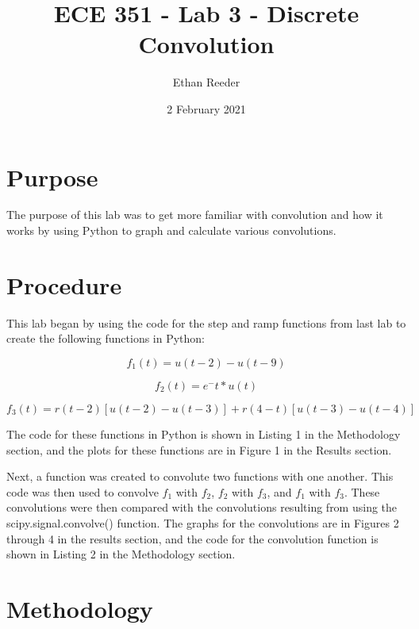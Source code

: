 \documentclass[12pt]{article}
\title{ECE 351 - Lab 3 - Discrete Convolution}
\author{Ethan Reeder}
\date{2 February 2021}
\begin{document}
\lstset{language=Python}

\maketitle

\newpage

\tableofcontents

\newpage

\section{Purpose}

The purpose of this lab was to get more familiar with convolution and how it works by using Python to graph and calculate various convolutions.

\section{Procedure}
This lab began by using the code for the step and ramp functions from last lab to create the following functions in Python:

\begin{equation}
    f_1(t) = u(t-2) - u(t-9)
\end{equation}

\begin{equation}
    f_2(t) = e^-t * u(t)
\end{equation}

\begin{equation}
    f_3(t) = r(t-2)[u(t-2) - u(t-3)] + r(4-t)[u(t-3) - u(t-4)]
\end{equation}

The code for these functions in Python is shown in Listing 1 in the Methodology section, and the plots for these functions are in Figure 1 in the Results section.

Next, a function was created to convolute two functions with one another. This code was then used to convolve $f_1$ with $f_2$, $f_2$ with $f_3$, and $f_1$ with $f_3$. These convolutions were then compared with the convolutions resulting from using the scipy.signal.convolve() function. The graphs for the convolutions are in Figures 2 through 4 in the results section, and the code for the convolution function is shown in Listing 2 in the Methodology section.

\section{Methodology}
\end{document}
